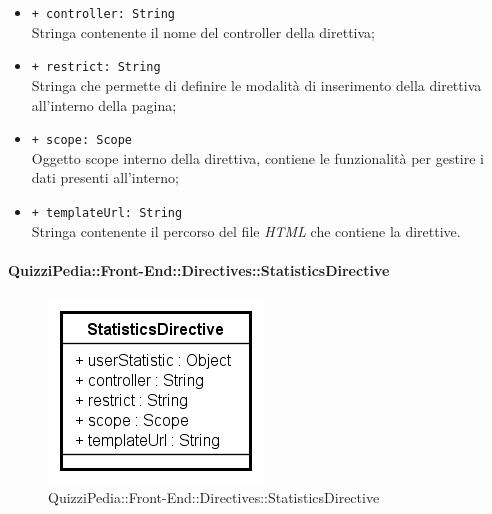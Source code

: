 \begin{itemize}
\begin{itemize}
		\item \texttt{+ controller: String} \\ Stringa contenente il nome del controller della direttiva;
		\item \texttt{+ restrict: String} \\ Stringa che permette di definire le modalità di inserimento della direttiva all'interno della pagina;
		\item \texttt{+ scope: Scope} \\ Oggetto scope interno della direttiva, contiene le funzionalità per gestire i dati presenti all'interno;
		\item \texttt{+ templateUrl: String} \\ Stringa contenente il percorso del file \textit{HTML} che contiene la direttive.
	\end{itemize}
\end{itemize}

\paragraph{QuizziPedia::Front-End::Directives::StatisticsDirective}

\label{QuizziPedia::Front-End::Directives::StatisticsDirective}

\begin{figure}[h]
	\centering
	\includegraphics[scale=0.5,keepaspectratio]{UML/Classi/Front-End/QuizziPedia_Front-end_Directives_StatisticsDirective.png}
	\caption{QuizziPedia::Front-End::Directives::StatisticsDirective}
\end{figure}

